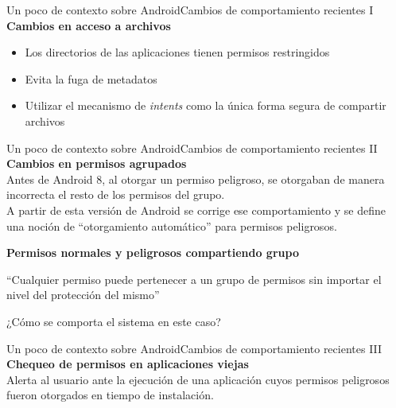 \documentclass[pdf]{beamer} %
\begin{document}
\begin{frame}{Un poco de contexto sobre Android}{Cambios de comportamiento recientes I}
    \textbf{Cambios en acceso a archivos}\\
    \vspace{10px}
    \begin{itemize}
        \item Los directorios de las aplicaciones tienen permisos restringidos
        \item Evita la fuga de metadatos
        \item Utilizar el mecanismo de \textit{intents} como la única forma segura de compartir
              archivos
    \end{itemize}
    \vspace{10px}
\end{frame}

\begin{frame}{Un poco de contexto sobre Android}{Cambios de comportamiento recientes II}
    \textbf{Cambios en permisos agrupados} \\
    \vspace{10px}
    Antes de Android 8, al otorgar un permiso peligroso, se otorgaban de manera incorrecta el resto
    de los permisos del grupo.\\
    \vspace{5px}
    A partir de esta versión de Android se corrige ese comportamiento y se define una noción de
    ``otorgamiento automático'' para permisos peligrosos.

    \vspace{10px} \pause
    \textbf{Permisos normales y peligrosos compartiendo grupo} \\
    \begin{block}{}
        ``Cualquier permiso puede pertenecer a un grupo de permisos sin importar el nivel del
        protección del mismo''
    \end{block}
    ¿Cómo se comporta el sistema en este caso?
\end{frame}

\begin{frame}{Un poco de contexto sobre Android}{Cambios de comportamiento recientes III}
    \textbf{Chequeo de permisos en aplicaciones viejas} \\
    \vspace{10px}
    Alerta al usuario ante la ejecución de una aplicación cuyos permisos peligrosos fueron otorgados
    en tiempo de instalación.
\end{frame}
\end{document}
